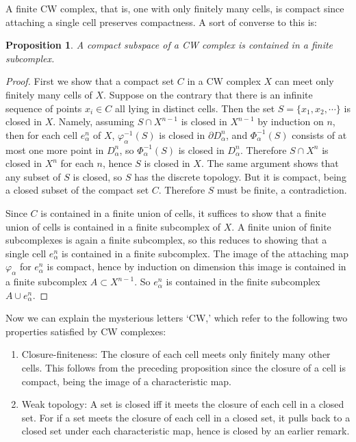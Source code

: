 \documentclass{article}
\newtheorem{proposition}[theorem]{Proposition}
\theoremstyle{definition}
\begin{document}
A finite CW complex, that is, one with only finitely many cells, is compact since attaching a single cell preserves compactness. A sort of converse to this is:

\begin{proposition}
A compact subspace of a CW complex is contained in a finite subcomplex.
\end{proposition}

\begin{proof}
First we show that a compact set $C$ in a CW complex $X$ can meet only finitely many cells of $X$. Suppose on the contrary that there is an infinite sequence of points $x_i \in C$ all lying in distinct cells. Then the set $S = \{x_1, x_2, \cdots\}$ is closed in $X$. Namely, assuming $S \cap X^{n-1}$ is closed in $X^{n-1}$ by induction on $n$, then for each cell $e_{\alpha}^{n}$ of $X$, $\varphi_{\alpha}^{-1}(S)$ is closed in $\partial D_{\alpha}^{n}$, and $\Phi_{\alpha}^{-1}(S)$ consists of at most one more point in $D_{\alpha}^{n}$, so $\Phi_{\alpha}^{-1}(S)$ is closed in $D_{\alpha}^{n}$. Therefore $S \cap X^n$ is closed in $X^n$ for each $n$, hence $S$ is closed in $X$. The same argument shows that any subset of $S$ is closed, so $S$ has the discrete topology. But it is compact, being a closed subset of the compact set $C$. Therefore $S$ must be finite, a contradiction.

Since $C$ is contained in a finite union of cells, it suffices to show that a finite union of cells is contained in a finite subcomplex of $X$. A finite union of finite subcomplexes is again a finite subcomplex, so this reduces to showing that a single cell $e_{\alpha}^{n}$ is contained in a finite subcomplex. The image of the attaching map $\varphi_{\alpha}$ for $e_{\alpha}^{n}$ is compact, hence by induction on dimension this image is contained in a finite subcomplex $A \subset X^{n-1}$. So $e_{\alpha}^{n}$ is contained in the finite subcomplex $A \cup e_{\alpha}^{n}$.
\end{proof}

Now we can explain the mysterious letters `CW,' which refer to the following two properties satisfied by CW complexes:

\begin{enumerate}
\item Closure-finiteness: The closure of each cell meets only finitely many other cells. This follows from the preceding proposition since the closure of a cell is compact, being the image of a characteristic map.
\item Weak topology: A set is closed iff it meets the closure of each cell in a closed set. For if a set meets the closure of each cell in a closed set, it pulls back to a closed set under each characteristic map, hence is closed by an earlier remark.
\end{enumerate}
\end{document}
